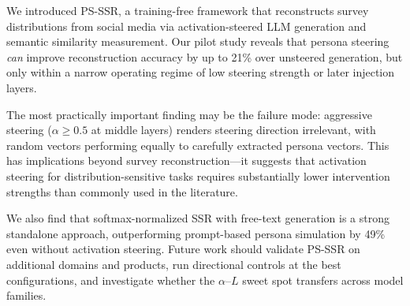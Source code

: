 \documentclass[letterpaper]{article}
\newcommand{\method}{PS-SSR}
\begin{document}
We introduced \method{}, a training-free framework that reconstructs survey distributions from social media via activation-steered LLM generation and semantic similarity measurement. Our pilot study reveals that persona steering \emph{can} improve reconstruction accuracy by up to 21\% over unsteered generation, but only within a narrow operating regime of low steering strength or later injection layers.

The most practically important finding may be the failure mode: aggressive steering ($\alpha \geq 0.5$ at middle layers) renders steering direction irrelevant, with random vectors performing equally to carefully extracted persona vectors. This has implications beyond survey reconstruction---it suggests that activation steering for distribution-sensitive tasks requires substantially lower intervention strengths than commonly used in the literature.

We also find that softmax-normalized SSR with free-text generation is a strong standalone approach, outperforming prompt-based persona simulation by 49\% even without activation steering. Future work should validate \method{} on additional domains and products, run directional controls at the best configurations, and investigate whether the $\alpha$--$L$ sweet spot transfers across model families.




\end{document}
